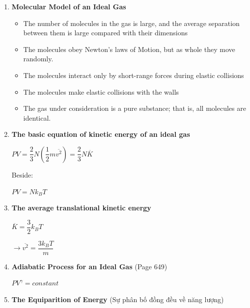 \documentclass[10pt]{article}
\begin{document}
\begin{enumerate}
	\item \textbf{Molecular Model of an Ideal Gas}
	\begin{itemize}
		\item The number of molecules in the gas is large, and the average separation between them is large compared with their dimensions
		\item The molecules obey Newton's laws of Motion, but as whole they move randomly.
		\item The molecules interact only by short-range forces during elastic collisions
		\item The molecules make elastic collisions with the walls
		\item The gas under consideration is a pure substance; that is, all molecules are identical.
	\end{itemize}
	\item \textbf{The basic equation of kinetic energy of an ideal gas}
	\begin{mybox}
	\begin{center}
	$PV = \dfrac{2}{3}N(\dfrac{1}{2}m \overline{v^2}) = \dfrac{2}{3}N \overline{K}$
	\end{center}
	\end{mybox}
	Beside: 
	\begin{mybox}
      \begin{center}
	$PV = Nk_BT$
      \end{center}  
	\end{mybox}
	\item \textbf{The average translational kinetic energy}
	\begin{mybox}
	\begin{center}
	$\overline{K} = \dfrac{3}{2}k_BT$
	\end{center}
	\end{mybox}
	\begin{center}
	$\rightarrow{\overline{v^2} = \dfrac{3k_BT}{m}}$
	\end{center}
	\item \textbf{Adiabatic Process for an Ideal Gas} (Page 649)
	\begin{mybox}
	\begin{center}
	$PV^{\gamma} = constant$
	\end{center}
	\end{mybox}
	\item \textbf{The Equiparition of Energy} (Sự phân bố đồng đều về năng lượng)\\

\end{enumerate}
\end{document}
